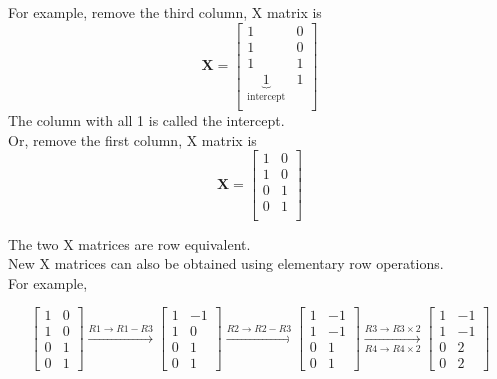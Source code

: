 \documentclass[12pt]{article}
\begin{document}
For example, remove the third column, X matrix is
\[
\boldsymbol{X}
=
\begin{bmatrix}
	1 & 0 \\
	1 & 0 \\
   1 & 1 \\
	\underbrace{1}_{\text{intercept}} & 1 \\
\end{bmatrix}
\]
The column with all 1 is called the intercept. \\

Or, remove the first column, X matrix is
\[
\boldsymbol{X} =
\begin{bmatrix}
	1 & 0 \\
	1 & 0 \\
	0 & 1 \\
	0 & 1 \\
\end{bmatrix}
\]

The two X matrices are row equivalent. \\ 

New X matrices can also be obtained using elementary row operations. \\

For example, 

\begin{equation*}
\begin{bmatrix}
	1 & 0 \\
	1 & 0 \\
	0 & 1 \\
	0 & 1 
\end{bmatrix}
\xrightarrow{\text{$R1 \rightarrow R1-R3$}}
\begin{bmatrix}
	1 & -1 \\
	1 & 0 \\
	0 & 1 \\
	0 & 1 
\end{bmatrix}
\xrightarrow{\text{$R2 \rightarrow R2-R3$}}
\begin{bmatrix}
	1 & -1 \\
	1 & -1 \\
	0 & 1 \\
	0 & 1 
\end{bmatrix}
\xrightarrow[\text{$R4 \rightarrow R4 \times 2$}]{\text{$R3 \rightarrow R3 \times 2$}}
\begin{bmatrix}
	1 & -1 \\
	1 & -1 \\
	0 & 2 \\
	0 & 2
\end{bmatrix}
\end{equation*}
\end{document}
